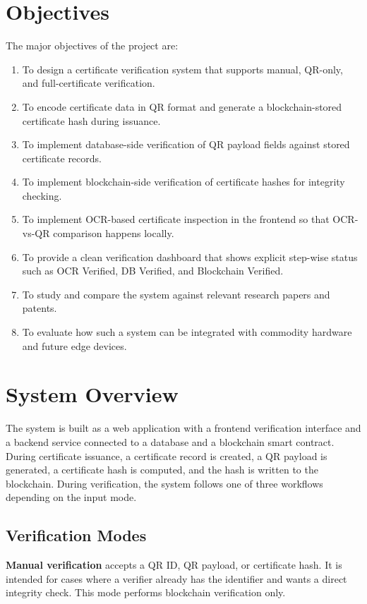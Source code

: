\documentclass[12pt,a4paper]{article}
\begin{document}
\section{Objectives}
The major objectives of the project are:
\begin{enumerate}[leftmargin=1.5em]
\item To design a certificate verification system that supports manual, QR-only, and full-certificate verification.
\item To encode certificate data in QR format and generate a blockchain-stored certificate hash during issuance.
\item To implement database-side verification of QR payload fields against stored certificate records.
\item To implement blockchain-side verification of certificate hashes for integrity checking.
\item To implement OCR-based certificate inspection in the frontend so that OCR-vs-QR comparison happens locally.
\item To provide a clean verification dashboard that shows explicit step-wise status such as OCR Verified, DB Verified, and Blockchain Verified.
\item To study and compare the system against relevant research papers and patents.
\item To evaluate how such a system can be integrated with commodity hardware and future edge devices.
\end{enumerate}

\section{System Overview}
The system is built as a web application with a frontend verification interface and a backend service connected to a database and a blockchain smart contract. During certificate issuance, a certificate record is created, a QR payload is generated, a certificate hash is computed, and the hash is written to the blockchain. During verification, the system follows one of three workflows depending on the input mode.

\subsection{Verification Modes}
\textbf{Manual verification} accepts a QR ID, QR payload, or certificate hash. It is intended for cases where a verifier already has the identifier and wants a direct integrity check. This mode performs blockchain verification only.
\end{document}

